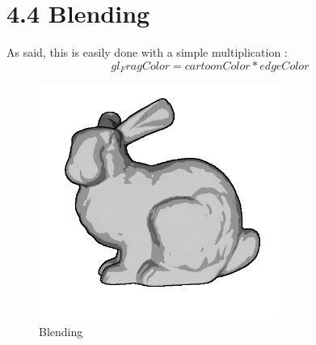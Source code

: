 \documentclass[10pt,a4paper]{report}
\begin{document}
\section*{4.4   Blending }
As said, this is easily done with a simple multiplication : $$gl_FragColor = cartoonColor * edgeColor$$
\begin{figure}[h!]
\caption{Blending}
  \centering
    \includegraphics[width=0.7\textwidth]{blending.png}
\end{figure}
\end{document}
